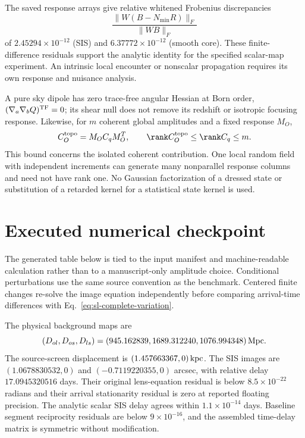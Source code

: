 The saved response arrays give relative whitened Frobenius discrepancies
\begin{equation}
 \frac{\|W(B-N_{\min}R)\|_F}{\|WB\|_F}
\end{equation}
of
$2.45294\times10^{-12}$ (SIS) and $6.37772\times10^{-12}$ (smooth core).
These finite-difference residuals support the analytic identity for the
specified scalar-map experiment. An intrinsic local encounter or
nonscalar propagation requires its own response and nuisance analysis.

A pure sky dipole has zero trace-free angular Hessian at Born order,
$(\nabla_a\nabla_bQ)^{\rm TF}=0$; its shear null does not remove its
redshift or isotropic focusing response. Likewise, for $m$ coherent global
amplitudes and a fixed response $M_O$,
\begin{equation}
 C_O^{\rm topo}=M_OC_qM_O^T,\qquad
 \rank C_O^{\rm topo}\leq\rank C_q\leq m.
\end{equation}
This bound concerns the isolated coherent contribution. One local random
field with independent increments can generate many nonparallel response
columns and need not have rank one. No Gaussian factorization of a dressed
state or substitution of a retarded kernel for a statistical state kernel
is used.

\section{Executed numerical checkpoint}
\label{sec:sl-results}
The generated table below is tied to the input manifest and machine-readable
calculation rather than to a manuscript-only amplitude choice. Conditional
perturbations use the same source convention as the benchmark. Centered
finite changes re-solve the image equation independently before comparing
arrival-time differences with Eq.~\eqref{eq:sl-complete-variation}.

The physical background maps are
\begin{equation}
 (D_{ol},D_{os},D_{ls})
 =(945.162839,1689.312240,1076.994348)\,{\rm Mpc}.
\end{equation}
The source-screen displacement is $(1.457663367,0)\,{\rm kpc}$.
The SIS images are $(1.0678830532,0)$ and $(-0.7119220355,0)$ arcsec, with
relative delay $17.0945320516$ days. Their original lens-equation residual
is below $8.5\times10^{-22}$ radians and their arrival stationarity residual
is zero at reported floating precision. The analytic scalar SIS delay
agrees within $1.1\times10^{-14}$ days. Baseline segment reciprocity
residuals are below $9\times10^{-16}$, and the assembled time-delay matrix
is symmetric without modification.

